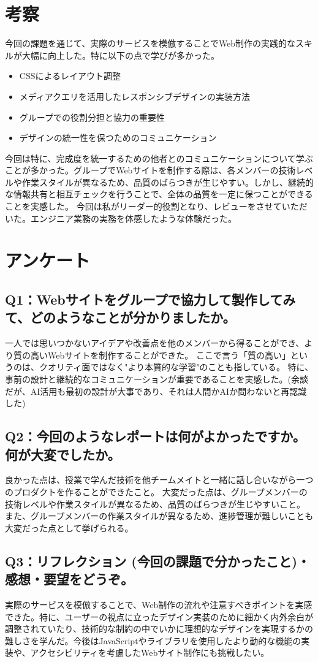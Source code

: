 \documentclass[12pt,a4j]{jarticle}
\begin{document}
\section{考察}
今回の課題を通じて、実際のサービスを模倣することでWeb制作の実践的なスキルが大幅に向上した。特に以下の点で学びが多かった。

\begin{itemize}
\item CSSによるレイアウト調整
\item メディアクエリを活用したレスポンシブデザインの実装方法
\item グループでの役割分担と協力の重要性
\item デザインの統一性を保つためのコミュニケーション
\end{itemize}

今回は特に、完成度を統一するための他者とのコミュニケーションについて学ぶことが多かった。グループでWebサイトを制作する際は、各メンバーの技術レベルや作業スタイルが異なるため、品質のばらつきが生じやすい。しかし、継続的な情報共有と相互チェックを行うことで、全体の品質を一定に保つことができることを実感した。
今回は私がリーダー的役割となり、レビューをさせていただいた。エンジニア業務の実務を体感したような体験だった。

\section{アンケート}

\subsection{Q1：Webサイトをグループで協力して製作してみて、どのようなことが分かりましたか。}
一人では思いつかないアイデアや改善点を他のメンバーから得ることができ、より質の高いWebサイトを制作することができた。
ここで言う「質の高い」というのは、クオリティ面ではなく"より本質的な学習"のことも指している。
特に、事前の設計と継続的なコミュニケーションが重要であることを実感した。(余談だが、AI活用も最初の設計が大事であり、それは人間かAIか問わないと再認識した)

\subsection{Q2：今回のようなレポートは何がよかったですか。何が大変でしたか。}
良かった点は、授業で学んだ技術を他チームメイトと一緒に話し合いながら一つのプロダクトを作ることができたこと。
大変だった点は、グループメンバーの技術レベルや作業スタイルが異なるため、品質のばらつきが生じやすいこと。
また、グループメンバーの作業スタイルが異なるため、進捗管理が難しいことも大変だった点として挙げられる。

\subsection{Q3：リフレクション (今回の課題で分かったこと)・感想・要望をどうぞ。}
実際のサービスを模倣することで、Web制作の流れや注意すべきポイントを実感できた。特に、ユーザーの視点に立ったデザイン実装のために細かく内外余白が調整されていたり、技術的な制約の中でいかに理想的なデザインを実現するかの難しさを学んだ。今後はJavaScriptやライブラリを使用したより動的な機能の実装や、アクセシビリティを考慮したWebサイト制作にも挑戦したい。
\end{document}
